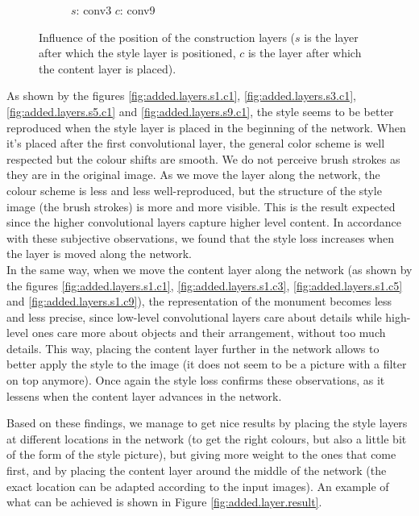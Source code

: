 \documentclass[twocolumn,superscriptaddress,aps, floatfix]{revtex4-1}
\begin{document}
\begin{figure}[ht]
\begin{subfigure}[b]{0.1\textwidth}
            \caption{$s$: conv3 $c$: conv9}
            \label{fig:added.layers.s3.c9}
        \end{subfigure}
        \caption{Influence of the position of the construction layers ($s$ is the layer after which the style layer is positioned, $c$ is the layer after which the content layer is placed).}
        \label{fig:added.layers}
    \end{figure}
    
    As shown by the figures \ref{fig:added.layers.s1.c1}, \ref{fig:added.layers.s3.c1}, \ref{fig:added.layers.s5.c1} and \ref{fig:added.layers.s9.c1}, the style seems to be better reproduced when the style layer is placed in the beginning of the network. When it's placed after the first convolutional layer, the general color scheme is well respected but the colour shifts are smooth. We do not perceive brush strokes as they are in the original image. As we move the layer along the network, the colour scheme is less and less well-reproduced, but the structure of the style image (the brush strokes) is more and more visible. This is the result expected since the higher convolutional layers capture higher level content. In accordance with these subjective observations, we found that the style loss increases when the layer is moved along the network.\\
    
    In the same way, when we move the content layer along the network (as shown by the figures \ref{fig:added.layers.s1.c1}, \ref{fig:added.layers.s1.c3}, \ref{fig:added.layers.s1.c5} and \ref{fig:added.layers.s1.c9}), the representation of the monument becomes less and less precise, since low-level convolutional layers care about details while high-level ones care more about objects and their arrangement, without too much details. This way, placing the content layer  further in the network allows to better apply the style to the image (it does not seem to be a picture with a filter on top anymore). Once again the style loss confirms these observations, as it lessens when the content layer advances in the network.
    
    Based on these findings, we manage to get nice results by placing the style layers at different locations in the network (to get the right colours, but also a little bit of the form of the style picture), but giving more weight to the ones that come first, and by placing the content layer around the middle of the network (the exact location can be adapted according to the input images). An example of what can be achieved is shown in Figure \ref{fig:added.layer.result}. 
    
\end{document}
